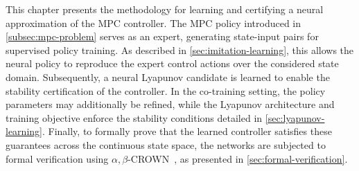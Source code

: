 This chapter presents the methodology for learning and certifying a neural approximation of the MPC controller. 
The MPC policy introduced in \cref{subsec:mpc-problem} serves as an expert, generating state-input pairs 
for supervised policy training. As described in \cref{sec:imitation-learning}, 
this allows the neural policy to reproduce the expert control actions over the considered state domain. 
Subsequently, a neural Lyapunov candidate is learned to enable the stability certification of the controller. 
In the co-training setting, the policy parameters may additionally be refined, while the Lyapunov architecture 
and training objective enforce the stability conditions detailed in \cref{sec:lyapunov-learning}.
Finally, to formally prove that the learned controller satisfies these guarantees across the 
continuous state space, the networks are subjected to formal verification using $\alpha,\beta$-CROWN~\cite{wang2021beta,xuFastCompleteEnabling2021}, 
as presented in \cref{sec:formal-verification}.